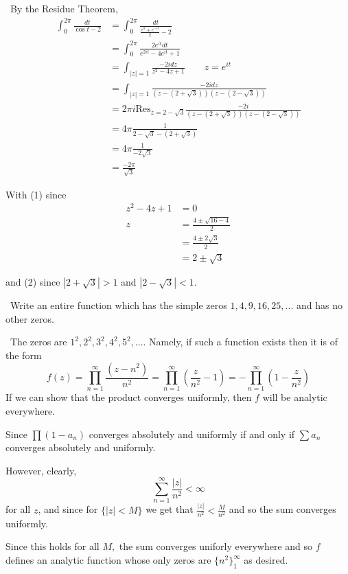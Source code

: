 \documentclass[12pt]{Homework}
\newcommand{\res}{\text{Res}}
\begin{document}
\begin{solution}$\,$ By the Residue Theorem,
\begin{align*}
    \int_0^{2\pi}\frac{dt}{\cos t-2}&=\int_0^{2\pi}\frac{dt}{\frac{e^{it}+e^{-it}}{2}-2}\\
    &=\int_0^{2\pi}\frac{2e^{it}dt}{e^{2it}-4e^{it}+1}\\
    &=\int_{|z|=1}\frac{-2idz}{z^2-4z+1}\qquad z=e^{it}\\
    &=\int_{|z|=1}\frac{-2idz}{(z-(2+\sqrt{3}))(z-(2-\sqrt{3}))}\tag{1}\\
    &=2\pi i\res_{z=2-\sqrt{3}}\frac{-2i}{(z-(2+\sqrt{3}))(z-(2-\sqrt{3}))}\\
    &=4\pi\frac{1}{2-\sqrt{3}-(2+\sqrt{3})}\\
    &=4\pi\frac{1}{-2\sqrt{3}}\\
    &=\frac{-2\pi}{\sqrt{3}}
\end{align*}

With (1) since \begin{align*}
    z^2-4z+1&=0\\
    z&=\frac{4\pm\sqrt{16-4}}{2}\\
    &=\frac{4\pm 2\sqrt{3}}{2}\\
    &=2\pm\sqrt{3}
\end{align*}

and (2) since $|2+\sqrt{3}|>1$ and $|2-\sqrt{3}|<1$.
\end{solution}
\newpage





\begin{problem} $\,$
Write an entire function which has the simple zeros $1,4,9,16,25,...$ and has no other zeros.
\end{problem}


\begin{solution}$\,$
The zeros are $1^2,2^2,3^2,4^2,5^2,...$. Namely, if such a function exists then it is of the form $$f(z)=\prod_{n=1}^\infty\frac{(z-n^2)}{n^2}=\prod_{n=1}^\infty\left(\frac{z}{n^2}-1\right)=-\prod_{n=1}^\infty\left(1-\frac{z}{n^2}\right)$$ If we can show that the product converges uniformly, then $f$ will be analytic everywhere.

Since $\prod(1-a_n)$ converges absolutely and uniformly if and only if $\sum a_n$ converges absolutely and uniformly. 

However, clearly, $$\sum_{n=1}^\infty\frac{|z|}{n^2}<\infty$$ for all $z$, and since for $\{|z|<M\}$ we get that $\frac{|z|}{n^2}<\frac{M}{n^2}$ and so the sum converges uniformly. 

Since this holds for all $M,$ the sum converges uniforly everywhere and so $f$ defines an analytic function whose only zeros are $\{n^2\}_1^\infty$ as desired.
\end{solution}
\end{document}
